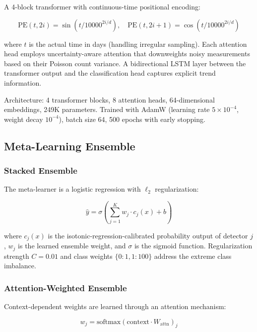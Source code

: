 \documentclass[10pt,a4paper]{article}
\begin{document}
A 4-block transformer with continuous-time positional encoding:

\begin{equation}
\text{PE}(t, 2i) = \sin(t / 10000^{2i/d}), \quad \text{PE}(t, 2i+1) = \cos(t / 10000^{2i/d})
\end{equation}

where $t$ is the actual time in days (handling irregular sampling). Each attention head employs uncertainty-aware attention that downweights noisy measurements based on their Poisson count variance. A bidirectional LSTM layer between the transformer output and the classification head captures explicit trend information.

Architecture: 4 transformer blocks, 8 attention heads, 64-dimensional embeddings, 249K parameters. Trained with AdamW (learning rate $5 \times 10^{-4}$, weight decay $10^{-4}$), batch size 64, 500 epochs with early stopping.

\subsection{Meta-Learning Ensemble}

\subsubsection{Stacked Ensemble}

The meta-learner is a logistic regression with $\ell_2$ regularization:

\begin{equation}
\hat{y} = \sigma\left( \sum_{j=1}^{K} w_j \cdot c_j(x) + b \right)
\end{equation}

where $c_j(x)$ is the isotonic-regression-calibrated probability output of detector $j$, $w_j$ is the learned ensemble weight, and $\sigma$ is the sigmoid function. Regularization strength $C = 0.01$ and class weights $\{0:1, 1:100\}$ address the extreme class imbalance.

\subsubsection{Attention-Weighted Ensemble}

Context-dependent weights are learned through an attention mechanism:

\begin{equation}
w_j = \text{softmax}(\text{context} \cdot W_{\text{attn}})_j
\end{equation}
\end{document}
